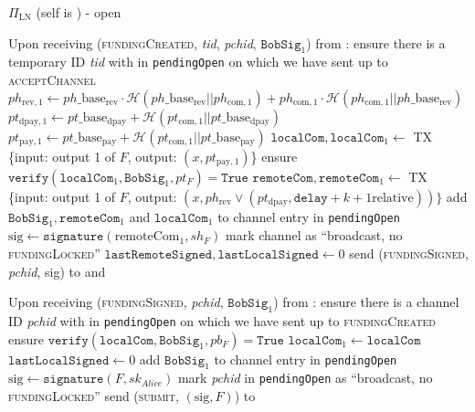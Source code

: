 \begin{protocolbox}{$\Pi_{\mathrm{LN}}$ (self is \alice) - open}
\begin{algorithmic}[1]
    \State Upon receiving (\textsc{fundingCreated}, \textit{tid},
    \textit{pchid}, $\mathtt{BobSig}_1$) from \bob:
    \Indent
      \State ensure there is a temporary ID \textit{tid} with \bob{} in
      \texttt{pendingOpen} on which we have sent up to \textsc{acceptChannel}
      \State $ph_{\mathrm{rev}, 1} \gets ph\_\mathrm{base}_{\mathrm{rev}} \cdot
      \mathcal{H}\left(ph\_\mathrm{base}_{\mathrm{rev}} ||
      ph_{\mathrm{com}, 1}\right) + ph_{\mathrm{com}, 1} \cdot \mathcal{H}\left(
      ph_{\mathrm{com}, 1} || ph\_\mathrm{base}_{\mathrm{rev}}\right)$
      \State $pt_{\mathrm{dpay}, 1} \gets pt\_\mathrm{base}_{\mathrm{dpay}} +
      \mathcal{H}\left(pt_{\mathrm{com}, 1} ||
      pt\_\mathrm{base}_{\mathrm{dpay}}\right)$
      \State $pt_{\mathrm{pay}, 1} \gets pt\_\mathrm{base}_{\mathrm{pay}} +
      \mathcal{H}\left(pt_{\mathrm{com}, 1} ||
      pt\_\mathrm{base}_{\mathrm{pay}}\right)$
      \State $\mathtt{localCom}, \mathtt{localCom}_1 \gets$ TX \{input: output 1
      of $F$, output: $\left(x, pt_{\mathrm{pay}, 1}\right)$\}
      \State ensure $\mathtt{verify}\left(\mathtt{localCom}_1,
      \mathtt{BobSig}_1, pt_F\right) = \mathtt{True}$
      \State $\mathtt{remoteCom}, \mathtt{remoteCom}_1 \gets$ TX \{input: output
      1 of $F$, output: $\left(x, ph_{\mathrm{rev}} \vee
      \left(pt_{\mathrm{dpay}}, \mathtt{delay} + k + 1 \text{
      relative}\right)\right)\}$
      \State add $\mathtt{BobSig}_1, \mathtt{remoteCom}_1$ and
      $\mathtt{localCom}_1$ to channel entry in \texttt{pendingOpen}
      \State $\mathrm{sig} \gets \mathtt{signature}\left(\mathrm{remoteCom}_1,
      sh_F\right)$
      \State mark channel as ``broadcast, no \textsc{fundingLocked}''
      \State $\mathtt{lastRemoteSigned}, \mathtt{lastLocalSigned} \gets 0$
      \State send (\textsc{fundingSigned}, \textit{pchid}, sig) to \bob{} and
      \adversary
    \EndIndent
    \State

    \State Upon receiving (\textsc{fundingSigned}, \textit{pchid},
    $\mathtt{BobSig}_1$) from \bob:
    \Indent
      \State ensure there is a channel ID \textit{pchid} with \bob{} in
      \texttt{pendingOpen} on which we have sent up to \textsc{fundingCreated}
      \State ensure $\mathtt{verify}\left(\mathtt{localCom}, \mathtt{BobSig}_1,
      pb_F\right) = \mathtt{True}$
      \State $\mathtt{localCom}_1 \gets \mathtt{localCom}$
      \State $\mathtt{lastLocalSigned} \gets 0$
      \State add $\mathtt{BobSig}_1$ to channel entry in \texttt{pendingOpen}
      \State $\mathrm{sig} \gets \mathtt{signature}\left(F,
      sk_{\mathit{Alice}}\right)$
      \State mark \textit{pchid} in \texttt{pendingOpen} as ``broadcast, no
      \textsc{fundingLocked}''
      \State send (\textsc{submit}, $\left(\mathrm{sig}, F\right)$) to \ledger
    \EndIndent
    \State


\end{algorithmic}
\end{protocolbox}
